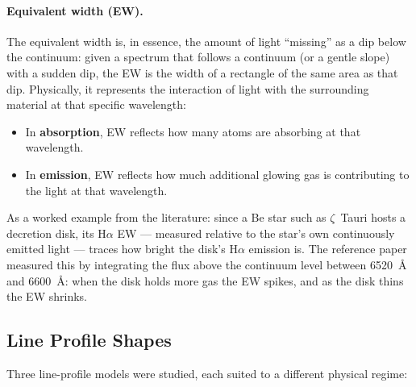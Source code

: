 \documentclass[12pt]{article}
\begin{document}
\paragraph{Equivalent width (EW).} The equivalent width is, in essence, the amount of light ``missing'' as a dip below the continuum: given a spectrum that follows a continuum (or a gentle slope) with a sudden dip, the EW is the width of a rectangle of the same area as that dip. Physically, it represents the interaction of light with the surrounding material at that specific wavelength:

\begin{itemize}[leftmargin=*]
  \item In \textbf{absorption}, EW reflects how many atoms are absorbing at that wavelength.
  \item In \textbf{emission}, EW reflects how much additional glowing gas is contributing to the light at that wavelength.
\end{itemize}

As a worked example from the literature: since a Be star such as $\zeta$~Tauri hosts a decretion disk, its H$\alpha$ EW --- measured relative to the star's own continuously emitted light --- traces how bright the disk's H$\alpha$ emission is. The reference paper measured this by integrating the flux above the continuum level between \SI{6520}{\angstrom} and \SI{6600}{\angstrom}: when the disk holds more gas the EW spikes, and as the disk thins the EW shrinks.

\subsection{Line Profile Shapes}

Three line-profile models were studied, each suited to a different physical regime:
\end{document}
